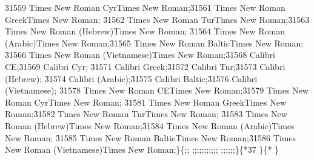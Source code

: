{\fdbminor\f31559\fbidi \froman{} Times New Roman Cyr{\*\falt Times New Roman};}{\fdbminor\f31561\fbidi \froman{} Times New Roman Greek{\*\falt Times New Roman};}
{\fdbminor\f31562\fbidi \froman{} Times New Roman Tur{\*\falt Times New Roman};}{\fdbminor\f31563\fbidi \froman{} Times New Roman (Hebrew){\*\falt Times New Roman};}
{\fdbminor\f31564\fbidi \froman{} Times New Roman (Arabic){\*\falt Times New Roman};}{\fdbminor\f31565\fbidi \froman{} Times New Roman Baltic{\*\falt Times New Roman};}
{\fdbminor\f31566\fbidi \froman{} Times New Roman (Vietnamese){\*\falt Times New Roman};}{\fhiminor\f31568\fbidi \fswiss{} Calibri CE;}{\fhiminor\f31569\fbidi \fswiss{} Calibri Cyr;}
{\fhiminor\f31571\fbidi \fswiss{} Calibri Greek;}{\fhiminor\f31572\fbidi \fswiss{} Calibri Tur;}{\fhiminor\f31573\fbidi \fswiss{} Calibri (Hebrew);}
{\fhiminor\f31574\fbidi \fswiss{} Calibri (Arabic);}{\fhiminor\f31575\fbidi \fswiss{} Calibri Baltic;}{\fhiminor\f31576\fbidi \fswiss{} Calibri (Vietnamese);}
{\fbiminor\f31578\fbidi \froman{} Times New Roman CE{\*\falt Times New Roman};}{\fbiminor\f31579\fbidi \froman{} Times New Roman Cyr{\*\falt Times New Roman};}
{\fbiminor\f31581\fbidi \froman{} Times New Roman Greek{\*\falt Times New Roman};}{\fbiminor\f31582\fbidi \froman{} Times New Roman Tur{\*\falt Times New Roman};}
{\fbiminor\f31583\fbidi \froman{} Times New Roman (Hebrew){\*\falt Times New Roman};}{\fbiminor\f31584\fbidi \froman{} Times New Roman (Arabic){\*\falt Times New Roman};}
{\fbiminor\f31585\fbidi \froman{} Times New Roman Baltic{\*\falt Times New Roman};}{\fbiminor\f31586\fbidi \froman{} Times New Roman (Vietnamese){\*\falt Times New Roman};}\}\{;;
;;;;;;;;;;;
;;;;;;\}\{* \f37
\}\{* \ql {}\widctlpar\wrapdefault\aspalpha\aspnum\faauto\adjustright{}
\}
